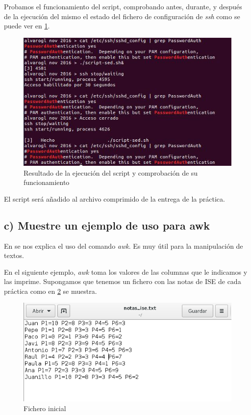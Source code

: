 Probamos el funcionamiento del script, comprobando antes, durante, y después de la ejecución del mismo el estado del fichero de configuración de \textit{ssh} como se puede ver en \ref{sed-script-prueba}.

\begin{figure}[H]
	\centering
	\includegraphics[scale=0.6]{sed-script-prueba.png}
	\caption{Resultado de la ejecución del script y comprobación de su funcionamiento} \label{sed-script-prueba}
\end{figure}

El script será añadido al archivo comprimido de la entrega de la práctica.

\subsection{c) Muestre un ejemplo de uso para awk}

En \cite{awk} se nos explica el uso del comando \textit{awk}. Es muy útil para la manipulación de textos.

En el siguiente ejemplo, \textit{awk} toma los valores de las columnas que le indicamos y las imprime.
Supongamos que tenemos un fichero con las notas de ISE de cada práctica como en \ref{notas-ise} se muestra.

\begin{figure}[H]
	\centering
	\includegraphics[scale=0.6]{notas-ise.png}
	\caption{Fichero inicial} \label{notas-ise}
\end{figure}

